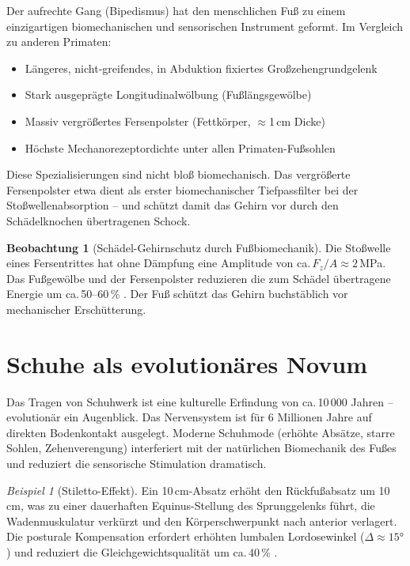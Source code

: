 ﻿\documentclass[12pt,a4paper]{report}
\theoremstyle{plain}
\theoremstyle{definition}
\newtheorem{beobachtung}[theorem]{Beobachtung}
\theoremstyle{remark}
\newtheorem{beispiel}[theorem]{Beispiel}
\begin{document}
Der aufrechte Gang (Bipedismus) hat den menschlichen Fuß zu einem
einzigartigen biomechanischen und sensorischen Instrument geformt. Im
Vergleich zu anderen Primaten:

\begin{itemize}
\item Längeres, nicht-greifendes, in Abduktion fixiertes Großzehengrundgelenk
\item Stark ausgeprägte Longitudinalwölbung (Fußlängsgewölbe)
\item Massiv vergrößertes Fersenpolster (Fettkörper, $\approx$1\,cm Dicke)
\item Höchste Mechanorezeptordichte unter allen Primaten-Fußsohlen
\end{itemize}

Diese Spezialisierungen sind nicht bloß biomechanisch. Das vergrößerte
Fersenpolster etwa dient als erster biomechanischer Tiefpassfilter
bei der Stoßwellenabsorption -- und schützt damit das Gehirn vor
durch den Schädelknochen übertragenen Schock.

\begin{beobachtung}[Schädel-Gehirnschutz durch Fußbiomechanik]
Die Stoßwelle eines Fersentrittes hat ohne Dämpfung eine Amplitude
von ca.\,$F_z/A \approx 2$\,MPa. Das Fußgewölbe und der Fersenpolster
reduzieren die zum Schädel übertragene Energie um ca.\,50--60\,\%
\cite{whittle1997}. Der Fuß schützt das Gehirn buchstäblich vor
mechanischer Erschütterung.
\end{beobachtung}

\section{Schuhe als evolutionäres Novum}

Das Tragen von Schuhwerk ist eine kulturelle Erfindung von ca.\,10\,000
Jahren -- evolutionär ein Augenblick. Das Nervensystem ist für 6 Millionen
Jahre auf direkten Bodenkontakt ausgelegt. Moderne Schuhmode
(erhöhte Absätze, starre Sohlen, Zehenverengung) interferiert mit
der natürlichen Biomechanik des Fußes und reduziert die sensorische
Stimulation dramatisch.

\begin{beispiel}[Stiletto-Effekt]
Ein 10\,cm-Absatz erhöht den Rückfußabsatz um 10\,cm, was zu einer
dauerhaften Equinus-Stellung des Sprunggelenks führt, die
Wadenmuskulatur verkürzt und den Körperschwerpunkt nach anterior verlagert.
Die posturale Kompensation erfordert erhöhten lumbalen Lordosewinkel
($\Delta \approx 15 °$) und reduziert die Gleichgewichtsqualität um
ca.\,40\,\% \cite{snow1992}.
\end{beispiel}
\end{document}
